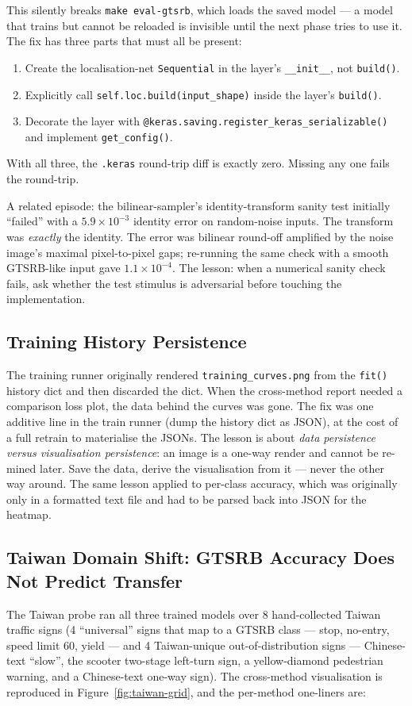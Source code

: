 \documentclass[11pt,a4paper]{article}
\begin{document}
This silently breaks \texttt{make eval-gtsrb}, which loads the saved model — a model that trains but cannot be reloaded is invisible until the next phase tries to use it. The fix has three parts that must all be present:
\begin{enumerate}
  \item Create the localisation-net \texttt{Sequential} in the layer's \texttt{\_\_init\_\_}, not \texttt{build()}.
  \item Explicitly call \texttt{self.loc.build(input\_shape)} inside the layer's \texttt{build()}.
  \item Decorate the layer with \texttt{@keras.saving.register\_keras\_serializable()} and implement \texttt{get\_config()}.
\end{enumerate}
With all three, the \texttt{.keras} round-trip diff is exactly zero. Missing any one fails the round-trip.

A related episode: the bilinear-sampler's identity-transform sanity test initially ``failed'' with a $5.9 \times 10^{-3}$ identity error on random-noise inputs. The transform was \emph{exactly} the identity. The error was bilinear round-off amplified by the noise image's maximal pixel-to-pixel gaps; re-running the same check with a smooth GTSRB-like input gave $1.1 \times 10^{-4}$. The lesson: when a numerical sanity check fails, ask whether the test stimulus is adversarial before touching the implementation.

\subsection{Training History Persistence}
\label{sec:history-persistence}
The training runner originally rendered \texttt{training\_curves.png} from the \texttt{fit()} history dict and then discarded the dict. When the cross-method report needed a comparison loss plot, the data behind the curves was gone. The fix was one additive line in the train runner (dump the history dict as JSON), at the cost of a full retrain to materialise the JSONs. The lesson is about \emph{data persistence versus visualisation persistence}: an image is a one-way render and cannot be re-mined later. Save the data, derive the visualisation from it — never the other way around. The same lesson applied to per-class accuracy, which was originally only in a formatted text file and had to be parsed back into JSON for the heatmap.

\subsection{Taiwan Domain Shift: GTSRB Accuracy Does Not Predict Transfer}
\label{sec:domain-shift}
The Taiwan probe ran all three trained models over 8 hand-collected Taiwan traffic signs (4 ``universal'' signs that map to a GTSRB class — stop, no-entry, speed limit 60, yield — and 4 Taiwan-unique out-of-distribution signs — Chinese-text ``slow'', the scooter two-stage left-turn sign, a yellow-diamond pedestrian warning, and a Chinese-text one-way sign). The cross-method visualisation is reproduced in Figure~\ref{fig:taiwan-grid}, and the per-method one-liners are:
\end{document}
